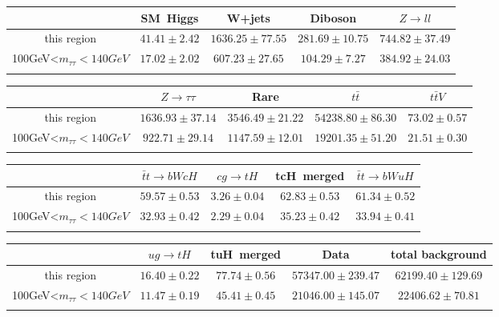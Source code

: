 \centering
\begin{tabular}{ccccc} \toprule\toprule
 & SM~Higgs & W+jets & Diboson & $Z\to ll$\\\midrule
this region & $41.41\pm2.42$ & $1636.25\pm77.55$ & $281.69\pm10.75$ & $744.82\pm37.49$\\
100GeV<$m_{\tau\tau}<140GeV$ & $17.02\pm2.02$ & $607.23\pm27.65$ & $104.29\pm7.27$ & $384.92\pm24.03$\\
\bottomrule\bottomrule\\
\end{tabular}
\begin{tabular}{ccccc} \toprule\toprule
 & $Z\to \tau\tau$ & Rare & $t\bar{t}$ & $t\bar{t}V$\\\midrule
this region & $1636.93\pm37.14$ & $3546.49\pm21.22$ & $54238.80\pm86.30$ & $73.02\pm0.57$\\
100GeV<$m_{\tau\tau}<140GeV$ & $922.71\pm29.14$ & $1147.59\pm12.01$ & $19201.35\pm51.20$ & $21.51\pm0.30$\\
\bottomrule\bottomrule\\
\end{tabular}
\begin{tabular}{ccccc} \toprule\toprule
 & $\bar{t}t\to bWcH$ & $cg\to tH$ & tcH~merged & $\bar{t}t\to bWuH$\\\midrule
this region & $59.57\pm0.53$ & $3.26\pm0.04$ & $62.83\pm0.53$ & $61.34\pm0.52$\\
100GeV<$m_{\tau\tau}<140GeV$ & $32.93\pm0.42$ & $2.29\pm0.04$ & $35.23\pm0.42$ & $33.94\pm0.41$\\
\bottomrule\bottomrule\\
\end{tabular}
\begin{tabular}{ccccc} \toprule\toprule
 & $ug\to tH$ & tuH~merged & Data & total background\\\midrule
this region & $16.40\pm0.22$ & $77.74\pm0.56$ & $57347.00\pm239.47$ & $62199.40\pm129.69$\\
100GeV<$m_{\tau\tau}<140GeV$ & $11.47\pm0.19$ & $45.41\pm0.45$ & $21046.00\pm145.07$ & $22406.62\pm70.81$\\
\bottomrule\bottomrule\\
\end{tabular}
